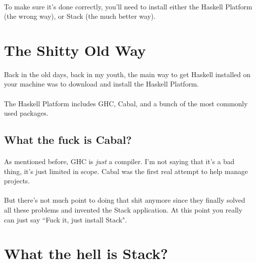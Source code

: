 \paragraph{}
To make sure it's done correctly, you'll need to install either the Haskell Platform (the wrong way), or Stack (the much better way). 


\section{The Shitty Old Way}
\paragraph{}
Back in the old days, back in my youth, the main way to get Haskell installed on your machine was to download and install the Haskell Platform. 

\paragraph{}
The Haskell Platform includes GHC, Cabal, and a bunch of the most commonly used packages.  

\subsection{What the fuck is Cabal?}
\paragraph{}
As mentioned before, GHC is \textit{just} a compiler.  I'm not saying that it's a bad thing, it's just limited in scope.  Cabal was the first real attempt to help manage projects.  

\paragraph{}


\paragraph{}
But there's not much point to doing that shit anymore since they finally solved all these problems and invented the Stack application.  At this point you really can just say ``Fuck it, just install Stack". 

\section{What the hell is Stack?}

